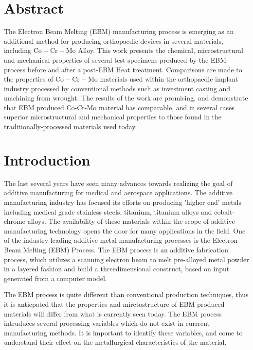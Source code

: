 \documentclass[10pt]{article}
\begin{document}
\section*{Abstract}
The Electron Beam Melting (EBM) manufacturing process is emerging as an additional method for producing orthopaedic devices in several materials, including $\mathrm{Co}-\mathrm{Cr}-\mathrm{Mo}$ Alloy. This work presents the chemical, microstructural and mechanical properties of several test specimens produced by the EBM process before and after a post-EBM Heat treatment. Comparisons are made to the properties of $\mathrm{Co}-\mathrm{Cr}-\mathrm{Mo}$ materials used within the orthopaedic implant industry processed by conventional methods such as investment casting and machining from wrought. The results of the work are promising, and demonstrate that EBM produced Co-Cr-Mo material has comparable, and in several cases superior microstructural and mechanical properties to those found in the traditionally-processed materials used today.

\section*{Introduction}
The last several years have seen many advances towards realizing the goal of additive manufacturing for medical and aerospace applications. The additive manufacturing industry has focused its efforts on producing 'higher end' metals including medical grade stainless steels, titanium, titanium alloys and cobalt-chrome alloys. The availability of these materials within the scope of additive manufacturing technology opens the door for many applications in the field. One of the industry-leading additive metal manufacturing processes is the Electron Beam Melting (EBM) Process. The EBM process is an additive fabrication process, which utilizes a scanning electron beam to melt pre-alloyed metal powder in a layered fashion and build a threedimensional construct, based on input generated from a computer model.

The EBM process is quite different than conventional production techniques, thus it is anticpated that the properties and mirctostructure of EBM produced materials will differ from what is currently seen today. The EBM process intruduces several processing variables which do not exist in currrent manufacturing methods. It is important to identify these variables, and come to understand their effect on the metallurgical characteristics of the material.
\end{document}
